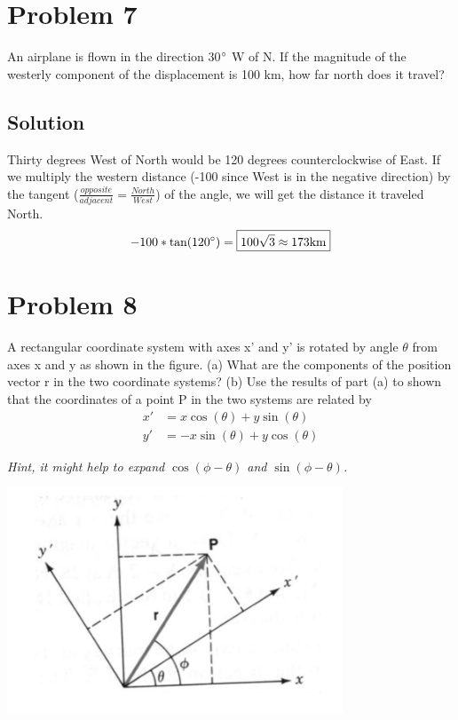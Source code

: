 \documentclass[12pt]{article}
\begin{document}
\pagebreak
\section*{Problem 7}
An airplane is flown in the direction 30$\degree$ W of N. If the magnitude of the westerly component of the displacement is 100 km, how far north does it travel?

\subsection*{Solution}

Thirty degrees West of North would be 120 degrees counterclockwise of East. If we multiply the western distance (-100 since West is in the negative direction) by the tangent ($\frac{opposite}{adjacent}=\frac{North}{West}$) of the angle, we will get the distance it traveled North.
\[
    -100*\tan(120\degree) = \boxed{100\sqrt{3} \approx 173\unit{km}}
\]

\pagebreak
\section*{Problem 8}
A rectangular coordinate system with axes x' and y' is rotated by angle $\theta$ from axes x and y as shown in the figure. (a) What are the components of the position vector r in the two coordinate systems? (b) Use the results of part (a) to shown that the coordinates of a point P in the two systems are related by
\begin{align*}
    x' &= x \cos(\theta) + y \sin(\theta)\\
    y' &= -x \sin(\theta) + y \cos(\theta)
\end{align*}

\textit{Hint, it might help to expand $\cos(\phi - \theta)$ and $\sin(\phi - \theta)$.}

\begin{center}
    \includegraphics*[width=10cm]{graph_8.png}
\end{center}
\end{document}
